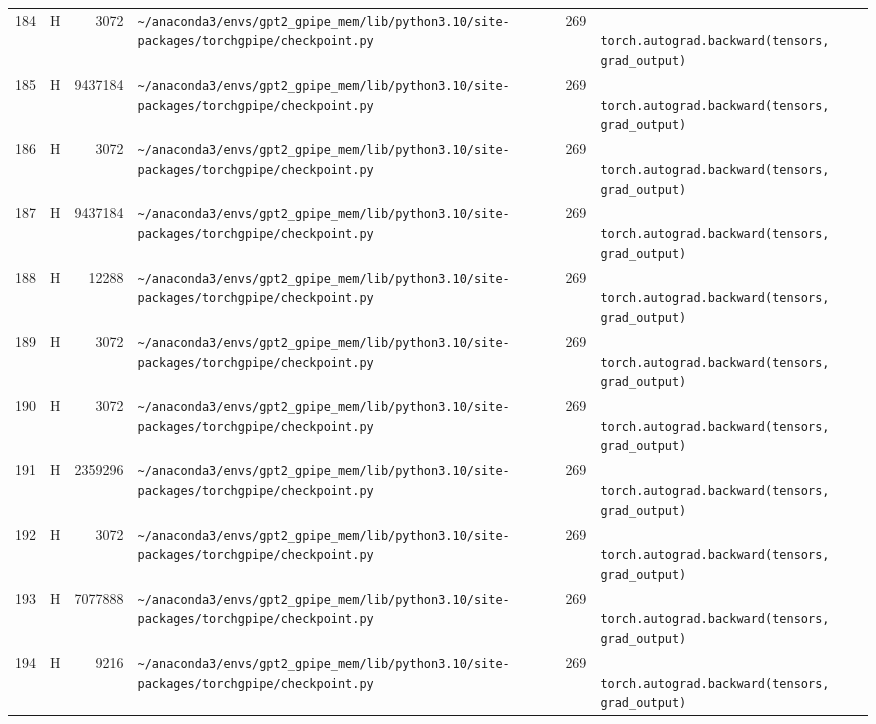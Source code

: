 \documentclass{article}
\begin{document}
\begin{longtable}{r l r p{6.5cm} r p{7.0cm}}
184 & H & 3072 & \lstinline|~/anaconda3/envs/gpt2_gpipe_mem/lib/python3.10/site-packages/torchgpipe/checkpoint.py| & 269 & \lstinline|            torch.autograd.backward(tensors, grad_output)| \\
185 & H & 9437184 & \lstinline|~/anaconda3/envs/gpt2_gpipe_mem/lib/python3.10/site-packages/torchgpipe/checkpoint.py| & 269 & \lstinline|            torch.autograd.backward(tensors, grad_output)| \\
186 & H & 3072 & \lstinline|~/anaconda3/envs/gpt2_gpipe_mem/lib/python3.10/site-packages/torchgpipe/checkpoint.py| & 269 & \lstinline|            torch.autograd.backward(tensors, grad_output)| \\
187 & H & 9437184 & \lstinline|~/anaconda3/envs/gpt2_gpipe_mem/lib/python3.10/site-packages/torchgpipe/checkpoint.py| & 269 & \lstinline|            torch.autograd.backward(tensors, grad_output)| \\
188 & H & 12288 & \lstinline|~/anaconda3/envs/gpt2_gpipe_mem/lib/python3.10/site-packages/torchgpipe/checkpoint.py| & 269 & \lstinline|            torch.autograd.backward(tensors, grad_output)| \\
189 & H & 3072 & \lstinline|~/anaconda3/envs/gpt2_gpipe_mem/lib/python3.10/site-packages/torchgpipe/checkpoint.py| & 269 & \lstinline|            torch.autograd.backward(tensors, grad_output)| \\
190 & H & 3072 & \lstinline|~/anaconda3/envs/gpt2_gpipe_mem/lib/python3.10/site-packages/torchgpipe/checkpoint.py| & 269 & \lstinline|            torch.autograd.backward(tensors, grad_output)| \\
191 & H & 2359296 & \lstinline|~/anaconda3/envs/gpt2_gpipe_mem/lib/python3.10/site-packages/torchgpipe/checkpoint.py| & 269 & \lstinline|            torch.autograd.backward(tensors, grad_output)| \\
192 & H & 3072 & \lstinline|~/anaconda3/envs/gpt2_gpipe_mem/lib/python3.10/site-packages/torchgpipe/checkpoint.py| & 269 & \lstinline|            torch.autograd.backward(tensors, grad_output)| \\
193 & H & 7077888 & \lstinline|~/anaconda3/envs/gpt2_gpipe_mem/lib/python3.10/site-packages/torchgpipe/checkpoint.py| & 269 & \lstinline|            torch.autograd.backward(tensors, grad_output)| \\
194 & H & 9216 & \lstinline|~/anaconda3/envs/gpt2_gpipe_mem/lib/python3.10/site-packages/torchgpipe/checkpoint.py| & 269 & \lstinline|            torch.autograd.backward(tensors, grad_output)| \\

\end{longtable}
\end{document}

